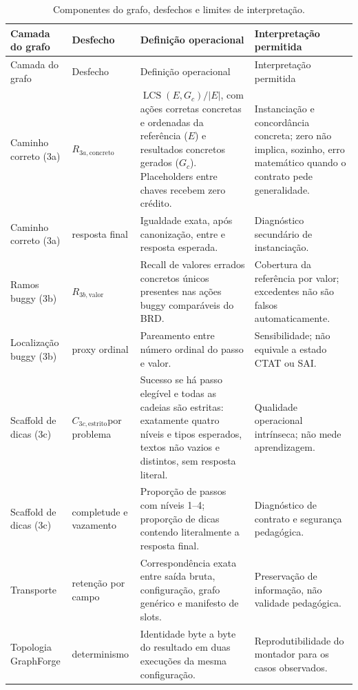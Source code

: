 \documentclass[11pt,a4paper]{article}
\newcommand{\Rthreea}{\ensuremath{R_{3a,\mathrm{concreto}}}}
\newcommand{\Rthreeb}{\ensuremath{R_{3b,\mathrm{valor}}}}
\newcommand{\Cthreec}{\ensuremath{C_{3c,\mathrm{estrito}}}}
\DeclareMathOperator{\LCS}{LCS}
\begin{document}
\begingroup
\small
\setlength{\tabcolsep}{3pt}
\begin{longtable}{@{}P{2.6cm}P{3.0cm}P{4.6cm}P{4.55cm}@{}}
\caption{Componentes do grafo, desfechos e limites de interpretação.}\label{tab:estimands}\\
\toprule
Camada do grafo & Desfecho & Definição operacional & Interpretação permitida \\
\midrule
\endfirsthead
\toprule
Camada do grafo & Desfecho & Definição operacional & Interpretação permitida \\
\midrule
\endhead
Caminho correto (3a) & \Rthreea & $\LCS(E,G_c)/|E|$, com ações corretas concretas e ordenadas da referência ($E$) e resultados concretos gerados ($G_c$). Placeholders entre chaves recebem zero crédito. & Instanciação e concordância concreta; zero não implica, sozinho, erro matemático quando o contrato pede generalidade. \\
Caminho correto (3a) & resposta final & Igualdade exata, após canonização, entre  e resposta esperada. & Diagnóstico secundário de instanciação. \\
Ramos buggy (3b) & \Rthreeb & Recall de valores errados concretos únicos presentes nas ações buggy comparáveis do BRD. & Cobertura da referência por valor; excedentes não são falsos automaticamente. \\
Localização buggy (3b) & proxy ordinal & Pareamento entre número ordinal do passo e valor. & Sensibilidade; não equivale a estado CTAT ou SAI. \\
Scaffold de dicas (3c) & \Cthreec por problema & Sucesso se há passo elegível e todas as cadeias são estritas: exatamente quatro níveis e tipos esperados, textos não vazios e distintos, sem resposta literal. & Qualidade operacional intrínseca; não mede aprendizagem. \\
Scaffold de dicas (3c) & completude e vazamento & Proporção de passos com níveis 1--4; proporção de dicas contendo literalmente a resposta final. & Diagnóstico de contrato e segurança pedagógica. \\
Transporte & retenção por campo & Correspondência exata entre saída bruta, configuração, grafo genérico e manifesto de slots. & Preservação de informação, não validade pedagógica. \\
Topologia GraphForge & determinismo & Identidade byte a byte do resultado em duas execuções da mesma configuração. & Reprodutibilidade do montador para os casos observados. \\
\bottomrule
\end{longtable}
\endgroup
\end{document}
